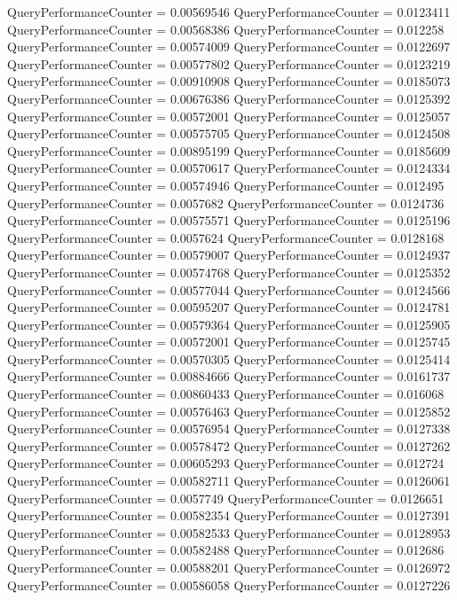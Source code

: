 \documentclass[9pt]{article}
\theoremstyle{plain}
\theoremstyle{definition}
\theoremstyle{remark}
\numberwithin{equation}{section}
\begin{document}
QueryPerformanceCounter  =  0.00569546
QueryPerformanceCounter  =  0.0123411
QueryPerformanceCounter  =  0.00568386
QueryPerformanceCounter  =  0.012258
QueryPerformanceCounter  =  0.00574009
QueryPerformanceCounter  =  0.0122697
QueryPerformanceCounter  =  0.00577802
QueryPerformanceCounter  =  0.0123219
QueryPerformanceCounter  =  0.00910908
QueryPerformanceCounter  =  0.0185073
QueryPerformanceCounter  =  0.00676386
QueryPerformanceCounter  =  0.0125392
QueryPerformanceCounter  =  0.00572001
QueryPerformanceCounter  =  0.0125057
QueryPerformanceCounter  =  0.00575705
QueryPerformanceCounter  =  0.0124508
QueryPerformanceCounter  =  0.00895199
QueryPerformanceCounter  =  0.0185609
QueryPerformanceCounter  =  0.00570617
QueryPerformanceCounter  =  0.0124334
QueryPerformanceCounter  =  0.00574946
QueryPerformanceCounter  =  0.012495
QueryPerformanceCounter  =  0.0057682
QueryPerformanceCounter  =  0.0124736
QueryPerformanceCounter  =  0.00575571
QueryPerformanceCounter  =  0.0125196
QueryPerformanceCounter  =  0.0057624
QueryPerformanceCounter  =  0.0128168
QueryPerformanceCounter  =  0.00579007
QueryPerformanceCounter  =  0.0124937
QueryPerformanceCounter  =  0.00574768
QueryPerformanceCounter  =  0.0125352
QueryPerformanceCounter  =  0.00577044
QueryPerformanceCounter  =  0.0124566
QueryPerformanceCounter  =  0.00595207
QueryPerformanceCounter  =  0.0124781
QueryPerformanceCounter  =  0.00579364
QueryPerformanceCounter  =  0.0125905
QueryPerformanceCounter  =  0.00572001
QueryPerformanceCounter  =  0.0125745
QueryPerformanceCounter  =  0.00570305
QueryPerformanceCounter  =  0.0125414
QueryPerformanceCounter  =  0.00884666
QueryPerformanceCounter  =  0.0161737
QueryPerformanceCounter  =  0.00860433
QueryPerformanceCounter  =  0.016068
QueryPerformanceCounter  =  0.00576463
QueryPerformanceCounter  =  0.0125852
QueryPerformanceCounter  =  0.00576954
QueryPerformanceCounter  =  0.0127338
QueryPerformanceCounter  =  0.00578472
QueryPerformanceCounter  =  0.0127262
QueryPerformanceCounter  =  0.00605293
QueryPerformanceCounter  =  0.012724
QueryPerformanceCounter  =  0.00582711
QueryPerformanceCounter  =  0.0126061
QueryPerformanceCounter  =  0.0057749
QueryPerformanceCounter  =  0.0126651
QueryPerformanceCounter  =  0.00582354
QueryPerformanceCounter  =  0.0127391
QueryPerformanceCounter  =  0.00582533
QueryPerformanceCounter  =  0.0128953
QueryPerformanceCounter  =  0.00582488
QueryPerformanceCounter  =  0.012686
QueryPerformanceCounter  =  0.00588201
QueryPerformanceCounter  =  0.0126972
QueryPerformanceCounter  =  0.00586058
QueryPerformanceCounter  =  0.0127226
\end{document}
